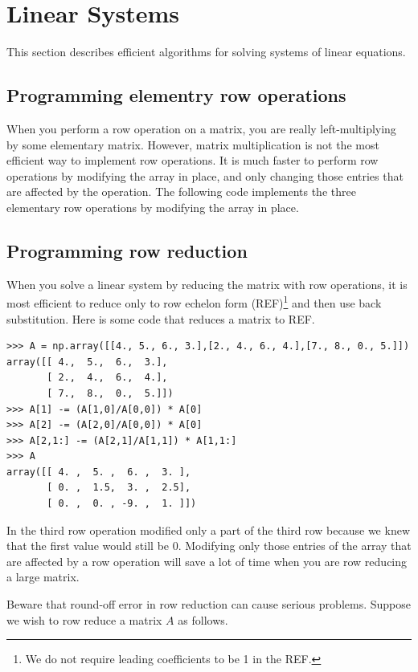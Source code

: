 \section*{Linear Systems}
This section describes efficient algorithms for solving systems of linear equations.

\subsection*{Programming elementry row operations}
When you perform a row operation on a matrix, you are really left-multiplying by some elementary matrix. However, matrix multiplication is not the most efficient way to implement row operations. It is much faster to perform row operations by modifying the array in place, and only changing those entries that are affected by the operation. The following code implements the three elementary row operations by modifying the array in place.



\subsection*{Programming row reduction}
When you solve a linear system by reducing the matrix with row operations, it is most efficient to reduce only to row echelon form (REF)\footnote{We do not require leading coefficients to be 1 in the REF.} and then use back substitution. Here is some code that reduces a matrix to REF.

\begin{lstlisting}
>>> A = np.array([[4., 5., 6., 3.],[2., 4., 6., 4.],[7., 8., 0., 5.]])
array([[ 4.,  5.,  6.,  3.],
       [ 2.,  4.,  6.,  4.],
       [ 7.,  8.,  0.,  5.]])
>>> A[1] -= (A[1,0]/A[0,0]) * A[0]
>>> A[2] -= (A[2,0]/A[0,0]) * A[0]
>>> A[2,1:] -= (A[2,1]/A[1,1]) * A[1,1:]
>>> A
array([[ 4. ,  5. ,  6. ,  3. ],
       [ 0. ,  1.5,  3. ,  2.5],
       [ 0. ,  0. , -9. ,  1. ]])
\end{lstlisting}

In the third row operation modified only a part of the third row because we knew that the first value would still be 0. 
Modifying only those entries of the array that are affected by a row operation will save a lot of time when you are row reducing a large matrix.

Beware that round-off error in row reduction can cause serious problems.
Suppose we wish to row reduce a matrix $A$ as follows.

